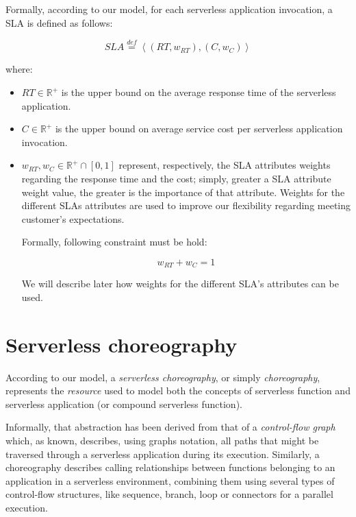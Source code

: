\documentclass[12pt,a4paper]{report}
\newcommand{\mathDef}{\overset{\textit{def}}{=}}
\newcommand{\Rplus}{\mathbb{R}^+}
\begin{document}
Formally, according to our model, for each serverless application invocation, a SLA is defined as follows:

\begin{equation}
	SLA \mathDef \left\langle (RT,w_{RT}),(C,w_{C}) \right\rangle 
\end{equation}
   
where:

\begin{itemize}
	\item $RT \in \mathbb{R}^+$ is the upper bound on the average
	response time of the serverless application.
	
	\item $C \in \mathbb{R}^+$ is the upper bound on average service cost per serverless application invocation.
	
	\item $w_{RT}, w_{C} \in \Rplus \cap \left[ 0,1 \right]$ represent, respectively, the SLA attributes weights regarding the response time and the cost; simply, greater a SLA attribute weight value, the greater is the importance of that attribute. Weights for the different SLAs attributes are used to improve our flexibility regarding meeting customer's expectations. 
	
	Formally, following constraint must be hold:
	
	\begin{equation}
		w_{RT} + w_{C} = 1
	\end{equation}

	We will describe later how weights for the different SLA's attributes can be used.
\end{itemize}

\section{Serverless choreography}

According to our model, a \textit{serverless choreography}, or simply \textit{choreography}, represents the \textit{resource} used to model both the concepts of serverless function and serverless application (or compound serverless function).

Informally, that abstraction has been derived from that of a \textit{control-flow graph} which, as known, describes, using graphs notation, all paths that might be traversed through a serverless application during its execution. Similarly, a choreography describes calling relationships between functions belonging to an application in a serverless environment, combining them using several types of control-flow structures, like sequence, branch, loop or connectors for a parallel execution. 
\end{document}
